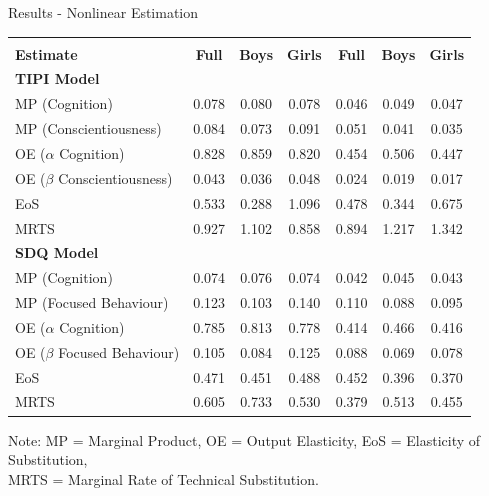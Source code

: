 \documentclass{beamer}
\begin{document}
\begin{frame}{Results - Nonlinear Estimation}
\hypertarget{NonlinearEstimation}{}
\centering
\tiny
\renewcommand{\arraystretch}{1.2}
\setlength{\tabcolsep}{4pt}
\begin{tabular}{l|>{\columncolor{gray!20}}c>{\columncolor{gray!20}}c>{\columncolor{gray!20}}c|ccc}
\toprule
\rowcolor{gray!30}
& \multicolumn{3}{c|}{\textbf{Maths}} & \multicolumn{3}{c}{\textbf{English}} \\
\cmidrule{2-7}
\rowcolor{gray!30}
\textbf{Estimate} & \textbf{Full} & \textbf{Boys} & \textbf{Girls} & \textbf{Full} & \textbf{Boys} & \textbf{Girls} \\
\midrule
\multicolumn{7}{l}{\textbf{TIPI Model}} \\
\midrule
MP (Cognition) & 0.078 & 0.080 & 0.078 & 0.046 & 0.049 & 0.047 \\
MP (Conscientiousness) & 0.084 & 0.073 & 0.091 & 0.051 & 0.041 & 0.035 \\
OE ($\alpha$ Cognition) & 0.828 & 0.859 & 0.820 & 0.454 & 0.506 & 0.447 \\
OE ($\beta$ Conscientiousness) & 0.043 & 0.036 & 0.048 & 0.024 & 0.019 & 0.017 \\
EoS & 0.533 & 0.288 & 1.096 & 0.478 & 0.344 & 0.675 \\
MRTS & 0.927 & 1.102 & 0.858 & 0.894 & 1.217 & 1.342 \\
\midrule
\multicolumn{7}{l}{\textbf{SDQ Model}} \\
\midrule
MP (Cognition) & 0.074 & 0.076 & 0.074 & 0.042 & 0.045 & 0.043 \\
MP (Focused Behaviour) & 0.123 & 0.103 & 0.140 & 0.110 & 0.088 & 0.095 \\
OE ($\alpha$ Cognition) & 0.785 & 0.813 & 0.778 & 0.414 & 0.466 & 0.416 \\
OE ($\beta$ Focused Behaviour) & 0.105 & 0.084 & 0.125 & 0.088 & 0.069 & 0.078 \\
EoS & 0.471 & 0.451 & 0.488 & 0.452 & 0.396 & 0.370 \\
MRTS & 0.605 & 0.733 & 0.530 & 0.379 & 0.513 & 0.455 \\
\bottomrule
\end{tabular}

\vspace{0.3em}
\scriptsize
Note: MP = Marginal Product, OE = Output Elasticity, EoS = Elasticity of Substitution, \\
MRTS = Marginal Rate of Technical Substitution.
\vfill
\hfill
\hyperlink{Key Concepts}{}

\end{frame}
\end{document}
